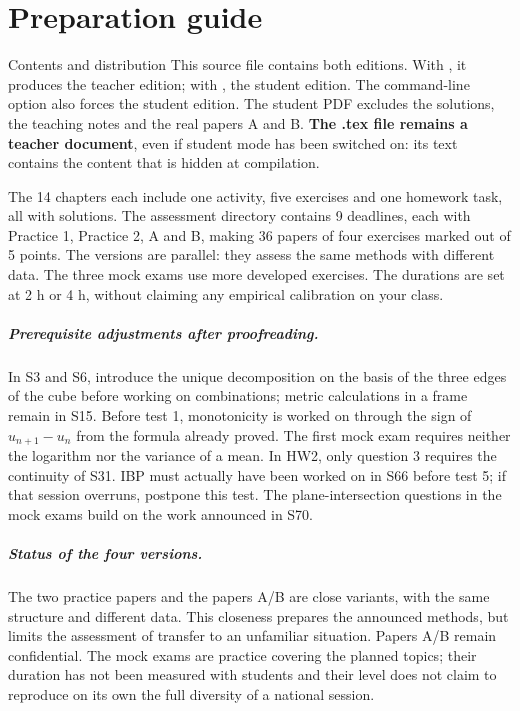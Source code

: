 \chapter*{Preparation guide}
\begin{profbox}{Contents and distribution}
This source file contains both editions. With \texttt{\string\proftrue}, it produces the teacher edition; with \texttt{\string\proffalse}, the student edition. The command-line option \texttt{\string\VERSIONELEVE} also forces the student edition. The student PDF excludes the solutions, the teaching notes and the real papers A and B. \textbf{The .tex file remains a teacher document}, even if student mode has been switched on: its text contains the content that is hidden at compilation.
\end{profbox}
The 14 chapters each include one activity, five exercises and one homework task, all with solutions. The assessment directory contains 9 deadlines, each with Practice 1, Practice 2, A and B, making 36 papers of four exercises marked out of 5 points. The versions are parallel: they assess the same methods with different data. The three mock exams use more developed exercises. The durations are set at 2 h or 4 h, without claiming any empirical calibration on your class.
\paragraph{Prerequisite adjustments after proofreading.} In S3 and S6, introduce the unique decomposition on the basis of the three edges of the cube before working on combinations; metric calculations in a frame remain in S15. Before test 1, monotonicity is worked on through the sign of $u_{n+1}-u_n$ from the formula already proved. The first mock exam requires neither the logarithm nor the variance of a mean. In HW2, only question 3 requires the continuity of S31. IBP must actually have been worked on in S66 before test 5; if that session overruns, postpone this test. The plane-intersection questions in the mock exams build on the work announced in S70.
\paragraph{Status of the four versions.} The two practice papers and the papers A/B are close variants, with the same structure and different data. This closeness prepares the announced methods, but limits the assessment of transfer to an unfamiliar situation. Papers A/B remain confidential. The mock exams are practice covering the planned topics; their duration has not been measured with students and their level does not claim to reproduce on its own the full diversity of a national session.
